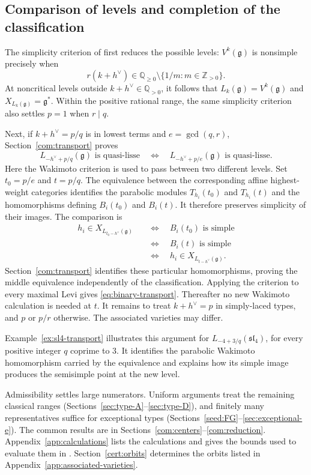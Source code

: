 \documentclass[11pt,a4paper]{amsart}
\numberwithin{equation}{section}
\theoremstyle{definition}
\theoremstyle{remark}
\newcommand{\Z}{\mathbb Z}
\newcommand{\Q}{\mathbb Q}
\newcommand{\g}{\mathfrak g}
\newcommand{\slg}{\mathfrak{sl}}
\begin{document}
\subsection{Comparison of levels and completion of the classification}\label{intro:level-comparison}
The simplicity criterion of \cite[Theorem~0.2.1]{GK} first reduces
the possible levels: $V^k(\g)$ is nonsimple precisely when
$$
 r(k+h^\vee)\in\Q_{\ge0}\setminus\{1/m:m\in\Z_{>0}\}.
$$
At noncritical levels outside $k+h^\vee\in\Q_{>0}$, it follows that
$L_k(\g)=V^k(\g)$ and $X_{L_k(\g)}=\g^*$. Within the positive
rational range, the same simplicity criterion also settles $p=1$
when $r\mid q$.

Next, if $k+h^\vee=p/q$ is in lowest terms and $e=\gcd(q,r)$,
Section~\ref{com:transport} proves
\begin{equation}\label{eq:binary-transport}
 L_{-h^\vee+p/q}(\g)\text{ is quasi-lisse}
 \quad\Longleftrightarrow\quad
 L_{-h^\vee+p/e}(\g)\text{ is quasi-lisse}.
\end{equation}
Here the Wakimoto criterion is used to pass between two different
levels. Set $t_0=p/e$ and $t=p/q$. The equivalence between the
corresponding affine highest-weight categories identifies the
parabolic modules $T_{h_i}(t_0)$ and $T_{h_i}(t)$ and the
homomorphisms defining $B_i(t_0)$ and $B_i(t)$.
It therefore preserves simplicity of their images. The comparison is
$$
\begin{aligned}
 h_i\in X_{L_{t_0-h^\vee}(\g)}
 &\quad\Longleftrightarrow\quad B_i(t_0)\text{ is simple}\\
 &\quad\Longleftrightarrow\quad B_i(t)\text{ is simple}\\
 &\quad\Longleftrightarrow\quad h_i\in X_{L_{t-h^\vee}(\g)}.
\end{aligned}
$$
Section~\ref{com:transport} identifies these particular homomorphisms,
proving the middle equivalence independently of the classification.
Applying the criterion to every maximal Levi gives
\eqref{eq:binary-transport}. Thereafter no new Wakimoto calculation
is needed at $t$. It remains to treat $k+h^\vee=p$ in simply-laced
types, and $p$ or $p/r$ otherwise. The associated varieties may differ.

Example~\ref{ex:sl4-transport} illustrates this argument for
$L_{-4+3/q}(\slg_4)$, for every positive integer $q$ coprime to $3$.
It identifies the parabolic Wakimoto homomorphism carried by the
equivalence and explains how its simple image produces the semisimple
point at the new level.

Admissibility settles large numerators. Uniform arguments treat the
remaining classical ranges (Sections~\ref{sec:type-A}--\ref{sec:type-D}),
and finitely many representatives suffice for exceptional types
(Sections~\ref{seed:FG}--\ref{sec:exceptional-e}). The common results
are in Sections~\ref{com:centers}--\ref{com:reduction}.
Appendix~\ref{app:calculations} lists the calculations and gives the
bounds used to evaluate them in \cite{Certificates}.
Section~\ref{cert:orbits} determines the orbits listed in
Appendix~\ref{app:associated-varieties}.
\end{document}

